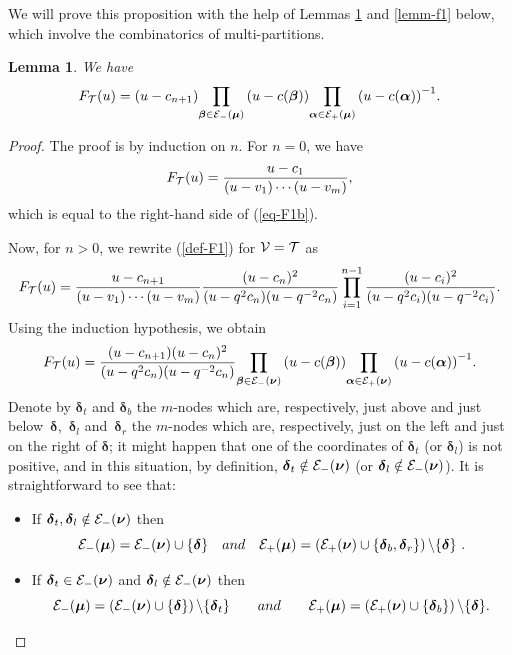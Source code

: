 \documentclass[11pt]{article}
\newcommand{\num}{\boldsymbol{\nu}}
\newcommand{\mum}{\boldsymbol{\mu}}
\newcommand{\alm}{\boldsymbol{\alpha}}
\newcommand{\bem}{\boldsymbol{\beta}}
\newcommand{\dem}{\boldsymbol{\delta}}
\newtheorem{Lemma}[Theorem]{Lemma}
\begin{document}
We will prove this proposition with the help of Lemmas \ref{lemm-f1b} and \ref{lemm-f1} below, which involve the combinatorics of multi-partitions.

\begin{Lemma}\label{lemm-f1b} We have
\begin{gather}\label{eq-F1b}
F_{{\cal{T}}}(u)=(u-c_{n+1}) {\prod_{\bem\in {\cal{E}}_-(\mum)}\left(u-c(\bem)\right)} {\prod_{\alm\in {\cal{E}}_+(\mum)}\left(u-c(\alm)\right)^{-1}}  .
\end{gather}
\end{Lemma}

\begin{proof}
 The proof  is by induction on $n$. For $n=0$, we have
\[
F_{{\cal{T}}}(u)=\frac{u-c_1}{(u-v_1)\cdots(u-v_m)},
\]
which is equal to the right-hand side of (\ref{eq-F1b}).


Now, for $n>0$, we rewrite (\ref{def-F1}) for ${\cal{V}}={\cal{T}}$ as
\[
F_{{\cal{T}}}(u)=\frac{u-c_{n+1}}{(u-v_1)\cdots(u-v_m)}\frac{(u-c_n)^2}{(u-q^2c_n)(u-q^{-2}c_n)}\prod_{i=1}^{n-1}\frac{(u-c_i)^2}{(u-q^2c_i)(u-q^{-2}c_i)}  .
\]
Using the induction hypothesis, we obtain
\begin{gather}\label{eq-F1c}
F_{{\cal{T}}}(u)=\frac{(u-c_{n+1})(u-c_n)^2}{(u-q^2c_n)(u-q^{-2}c_n)}
{\prod_{\bem\in {\cal{E}}_-(\num)}\left(u-c(\bem)\right)} {\prod_{\alm\in {\cal{E}}_+(\num)}\left(u-c(\alm)\right)^{-1}}  .
\end{gather}
Denote by $\dem_t$ and $\dem_b$ the $m$-nodes which are, respectively, just above and just below~$\dem$,~$\dem_l$ and~$\dem_r$ the $m$-nodes which are, respectively, just on the left and just on the right of $\dem$; it might happen that one of the coordinates of $\dem_t$ (or $\dem_l$) is not positive, and in this situation, by def\/inition, $\dem_t\notin {\cal{E}}_-(\num)$ (or $\dem_l\notin {\cal{E}}_-(\num)$).
It is straightforward to see that:
\begin{itemize}\itemsep=0pt
\item If $\dem_t,\dem_l\notin {\cal{E}}_-(\num)$ then \[{\cal{E}}_-(\mum)={\cal{E}}_-(\num)\cup\{\dem\}\quad\textrm{and}\quad {\cal{E}}_+(\mum)=\left({\cal{E}}_+(\num)\cup\{\dem_b,\dem_r\}\right)\backslash\{\dem\}\ .\]

\item If $\dem_t\in {\cal{E}}_-(\num)$ and $\dem_l\notin {\cal{E}}_-(\num)$ then \[{\cal{E}}_-(\mum)=\left({\cal{E}}_-(\num)\cup\{\dem\}\right)\backslash\{\dem_t\}\qquad\textrm{and}\qquad {\cal{E}}_+(\mum)=\left({\cal{E}}_+(\num)\cup\{\dem_b\}\right)\backslash\{\dem\}  .\]


\end{itemize}
\end{proof}
\end{document}
